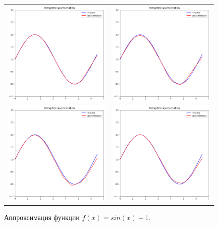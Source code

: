 \documentclass[12pt, a4paper]{article}
\begin{document}
    \begin{figure}[h]
        \center
        \begin{tabular}{cc}
            \includegraphics[width = 7cm]{f11_2_1.png}
            &
            \includegraphics[width = 7cm]{f11_2_2.png} \\
            \includegraphics[width = 7cm]{f11_2_3.png}
            &
            \includegraphics[width = 7cm]{f11_2_4.png} \\
        \end{tabular}
        \label{image2}
        \caption{Аппроксимация функции $f(x) = sin(x) + 1$.}
    \end{figure}
    
\end{document}
